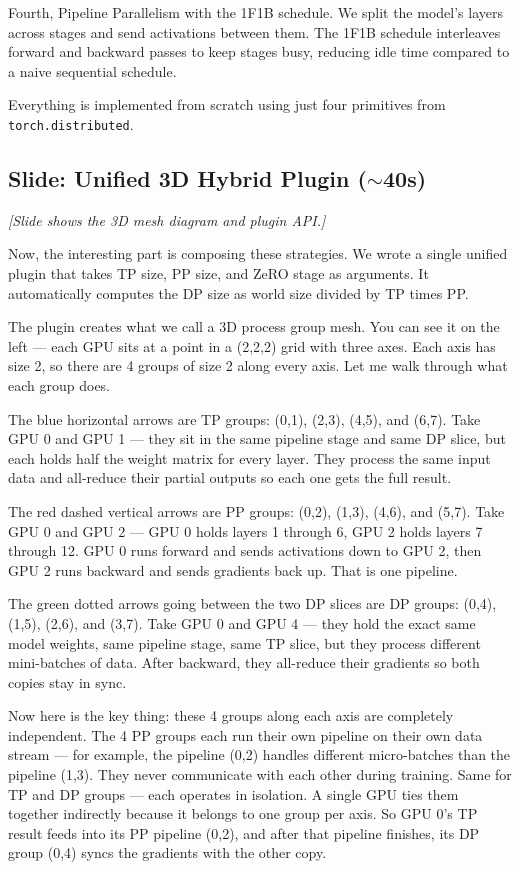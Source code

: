 \documentclass[11pt, a4paper]{article}
\begin{document}
Fourth, Pipeline Parallelism with the 1F1B schedule. We split the model's layers across stages and send activations between them. The 1F1B schedule interleaves forward and backward passes to keep stages busy, reducing idle time compared to a naive sequential schedule.

Everything is implemented from scratch using just four primitives from \texttt{torch.distributed}.

\subsection{Slide: Unified 3D Hybrid Plugin ($\sim$40s)}
\textit{[Slide shows the 3D mesh diagram and plugin API.]}

Now, the interesting part is composing these strategies. We wrote a single unified plugin that takes TP size, PP size, and ZeRO stage as arguments. It automatically computes the DP size as world size divided by TP times PP.

The plugin creates what we call a 3D process group mesh. You can see it on the left --- each GPU sits at a point in a (2,2,2) grid with three axes. Each axis has size 2, so there are 4 groups of size 2 along every axis. Let me walk through what each group does.

The blue horizontal arrows are TP groups: (0,1), (2,3), (4,5), and (6,7). Take GPU 0 and GPU 1 --- they sit in the same pipeline stage and same DP slice, but each holds half the weight matrix for every layer. They process the same input data and all-reduce their partial outputs so each one gets the full result.

The red dashed vertical arrows are PP groups: (0,2), (1,3), (4,6), and (5,7). Take GPU 0 and GPU 2 --- GPU 0 holds layers 1 through 6, GPU 2 holds layers 7 through 12. GPU 0 runs forward and sends activations down to GPU 2, then GPU 2 runs backward and sends gradients back up. That is one pipeline.

The green dotted arrows going between the two DP slices are DP groups: (0,4), (1,5), (2,6), and (3,7). Take GPU 0 and GPU 4 --- they hold the exact same model weights, same pipeline stage, same TP slice, but they process different mini-batches of data. After backward, they all-reduce their gradients so both copies stay in sync.

Now here is the key thing: these 4 groups along each axis are completely independent. The 4 PP groups each run their own pipeline on their own data stream --- for example, the pipeline (0,2) handles different micro-batches than the pipeline (1,3). They never communicate with each other during training. Same for TP and DP groups --- each operates in isolation. A single GPU ties them together indirectly because it belongs to one group per axis. So GPU 0's TP result feeds into its PP pipeline (0,2), and after that pipeline finishes, its DP group (0,4) syncs the gradients with the other copy.
\end{document}
